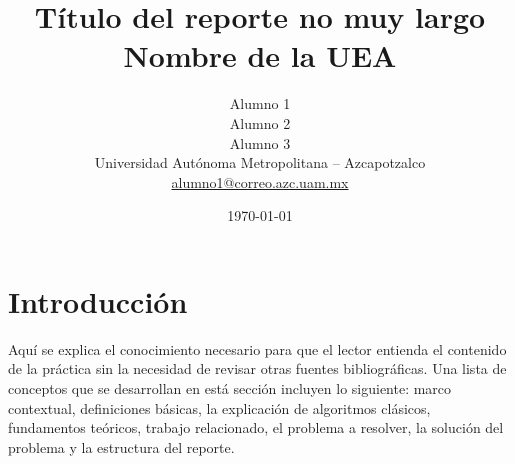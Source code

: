 \documentclass[10pt, twocolumn]{article}
\title{
   \textcolor{Xoc}{{\textbf Título del reporte no muy largo}}\\ %
   \textcolor{Wolf}{\large Nombre de la UEA} %
}
\author{Alumno 1\\ %
        Alumno 2\\
        Alumno 3\\
        Universidad Autónoma Metropolitana -- Azcapotzalco\\  %
        \href{mailto:alumno1@azc.uam.mx}{alumno1@correo.azc.uam.mx}
}
\date{\today} %
\begin{document}


\section{Introducción}

Aquí se explica el conocimiento necesario para que el lector entienda el contenido de la práctica sin la necesidad de revisar otras fuentes bibliográficas. Una lista de conceptos que se desarrollan en está sección incluyen lo siguiente: marco contextual, definiciones básicas, la explicación de algoritmos clásicos, fundamentos teóricos, trabajo relacionado, el problema a resolver, la solución del problema y la estructura del reporte.
\end{document}
